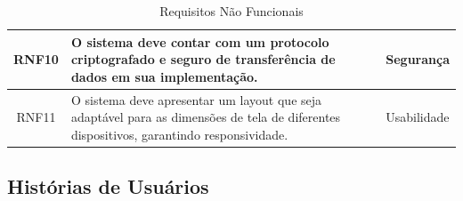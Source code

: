 \documentclass[
    12pt,               %
    openright,          %
    oneside,
    a4paper,            %
    BIBLATEX,           %
    TODO,               %
    english,            %
    brazil              %
    ]{ifsp-spo-inf-ctds}
\begin{document}
\begin{center}
\begin{table}[h]
\begin{tabulary}{1.0\textwidth}{|C|p{25em}|p{7em}|}
                \hline
                RNF10 & O sistema deve contar com um protocolo criptografado e seguro de transferência de dados em sua implementação. & Segurança\\
                \hline
                RNF11 & O sistema deve apresentar um layout que seja adaptável para as dimensões de tela de diferentes dispositivos, garantindo responsividade. & Usabilidade\\
                \hline
                \end{tabulary}
                \caption{Requisitos Não Funcionais}
                \label{tab:req_nfunc}
                \end{table}
            \end{center}

\subsection{Histórias de Usuários}
    
\end{document}
